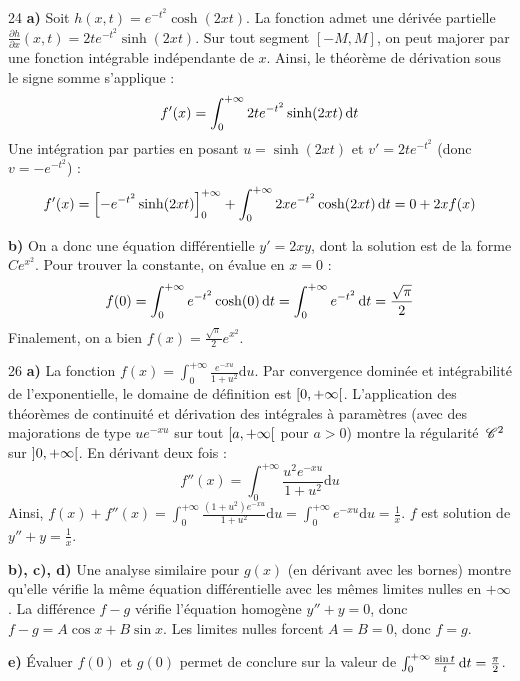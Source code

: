 \begin{correction}{24}
\textbf{a)} Soit $h(x, t) = e^{-t^2}\cosh(2xt)$. La fonction admet une dérivée partielle $\frac{\partial h}{\partial x}(x, t) = 2t e^{-t^2}\sinh(2xt)$.
Sur tout segment $[-M, M]$, on peut majorer par une fonction intégrable indépendante de $x$.
Ainsi, le théorème de dérivation sous le signe somme s'applique :
$$ f'(x) = \int_{0}^{+\infty} 2t e^{-t^2}\sinh(2xt) \,\mathrm{d}t $$
Une intégration par parties en posant $u = \sinh(2xt)$ et $v' = 2te^{-t^2}$ (donc $v = -e^{-t^2}$) :
$$ f'(x) = \left[ -e^{-t^2}\sinh(2xt) \right]_0^{+\infty} + \int_{0}^{+\infty} 2x e^{-t^2}\cosh(2xt) \,\mathrm{d}t = 0 + 2xf(x) $$

\textbf{b)} On a donc une équation différentielle $y' = 2xy$, dont la solution est de la forme $C e^{x^2}$.
Pour trouver la constante, on évalue en $x=0$ :
$$ f(0) = \int_{0}^{+\infty} e^{-t^2} \cosh(0) \,\mathrm{d}t = \int_{0}^{+\infty} e^{-t^2} \,\mathrm{d}t = \frac{\sqrt{\pi}}{2} $$
Finalement, on a bien $f(x) = \frac{\sqrt{\pi}}{2} e^{x^2}$.
\end{correction}

\begin{correction}{26}
\textbf{a)} La fonction $f(x) = \int_{0}^{+ \infty}\frac{e^{-xu}}{1+u^{2}}\mathrm{d}u$. Par convergence dominée et intégrabilité de l'exponentielle, le domaine de définition est $\left[0, +\infty\right[$. 
L'application des théorèmes de continuité et dérivation des intégrales à paramètres (avec des majorations de type $u e^{-xu}$ sur tout $\left[a, +\infty\right[$ pour $a>0$) montre la régularité $\,\mathscr C^{2}$ sur $\left]0, +\infty\right[$.
En dérivant deux fois :
$$ f''(x) = \int_{0}^{+ \infty} \frac{u^2 e^{-xu}}{1+u^2} \mathrm{d}u $$
Ainsi, $f(x) + f''(x) = \int_{0}^{+ \infty} \frac{(1+u^2) e^{-xu}}{1+u^2} \mathrm{d}u = \int_{0}^{+ \infty} e^{-xu} \mathrm{d}u = \frac{1}{x}$.
$f$ est solution de $y'' + y = \frac{1}{x}$.

\textbf{b), c), d)} Une analyse similaire pour $g(x)$ (en dérivant avec les bornes) montre qu'elle vérifie la même équation différentielle avec les mêmes limites nulles en $+\infty$. La différence $f-g$ vérifie l'équation homogène $y''+y=0$, donc $f-g = A\cos x + B\sin x$. Les limites nulles forcent $A=B=0$, donc $f=g$.

\textbf{e)} Évaluer $f(0)$ et $g(0)$ permet de conclure sur la valeur de $\int_{0}^{+\infty}\frac{\sin t}{t}\,\mathrm{d}t = \frac{\pi}{2}$.
\end{correction}
